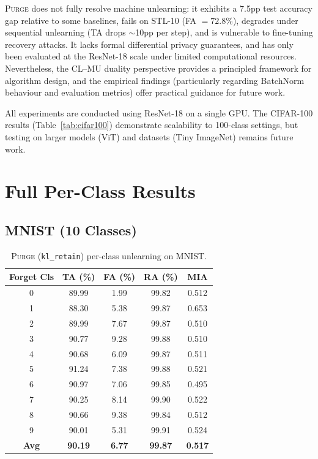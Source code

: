 \documentclass{article}
\newcommand{\ours}{\textsc{Purge}}
\newcommand{\klr}{\texttt{kl\_retain}}
\newcommand{\new}[1]{{\color{orange}#1}}
\begin{document}
\ours{} does not fully resolve machine unlearning: it exhibits a \new{7.5pp} test accuracy gap relative to some baselines\new{, fails on STL-10 (FA $= 72.8$\%), degrades under sequential unlearning (TA drops $\sim$10pp per step), and is vulnerable to fine-tuning recovery attacks}. \new{It} lacks formal differential privacy guarantees, and has only been evaluated at the ResNet-18 scale under limited computational resources.
Nevertheless, the CL--MU duality perspective provides a principled framework for algorithm design, and the empirical findings (particularly regarding BatchNorm behaviour and evaluation metrics) offer practical guidance for future work.

\new{All experiments are conducted using ResNet-18 on a single GPU. The CIFAR-100 results (Table~\ref{tab:cifar100}) demonstrate scalability to 100-class settings, but testing on larger models (ViT) and datasets (Tiny ImageNet) remains future work.}




\appendix

\section{Full Per-Class Results}
\label{app:perclass}

\subsection{MNIST (10 Classes)}

\begin{table}[h]
\centering
\caption{\ours{} (\klr{}) per-class unlearning on MNIST.}
\label{tab:mnist_full}
\small
\begin{tabular}{ccccc}
\toprule
Forget Cls & TA (\%) & FA (\%) & RA (\%) & MIA \\
\midrule
0 & 89.99 & 1.99 & 99.82 & 0.512 \\
1 & 88.30 & 5.38 & 99.87 & 0.653 \\
2 & 89.99 & 7.67 & 99.87 & 0.510 \\
3 & 90.77 & 9.28 & 99.88 & 0.510 \\
4 & 90.68 & 6.09 & 99.87 & 0.511 \\
5 & 91.24 & 7.38 & 99.88 & 0.521 \\
6 & 90.97 & 7.06 & 99.85 & 0.495 \\
7 & 90.25 & 8.14 & 99.90 & 0.522 \\
8 & 90.66 & 9.38 & 99.84 & 0.512 \\
9 & 90.01 & 5.31 & 99.91 & 0.524 \\
\midrule
\textbf{Avg} & \textbf{90.19} & \textbf{6.77} & \textbf{99.87} & \textbf{0.517} \\
\bottomrule
\end{tabular}
\end{table}
\end{document}
